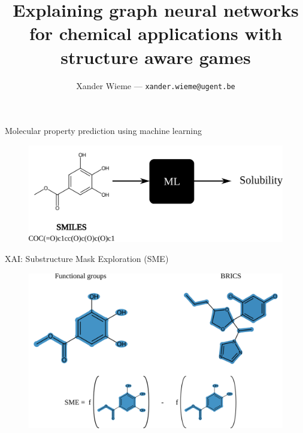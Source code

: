 \documentclass[aspectratio=169]{beamer}
\title{Explaining graph neural networks for chemical applications with structure aware games}
\subtitle{}
\author[DB]{Xander Wieme --- \texttt{xander.wieme@ugent.be}}
\date{}
\begin{document}

\logoframe

\titleframe



\begin{frame}{Molecular property prediction using machine learning}

    \begin{figure}[h]
        \centering 
        \includegraphics[scale=0.85]{./img/mpp.png}
    \end{figure}
   
\end{frame}


\begin{frame}{XAI: Substructure Mask Exploration (SME)}

    \begin{figure}[h]
        \centering 
        \includegraphics[scale=0.50]{./img/SME.png}
    \end{figure}
    
\end{frame}
\end{document}
